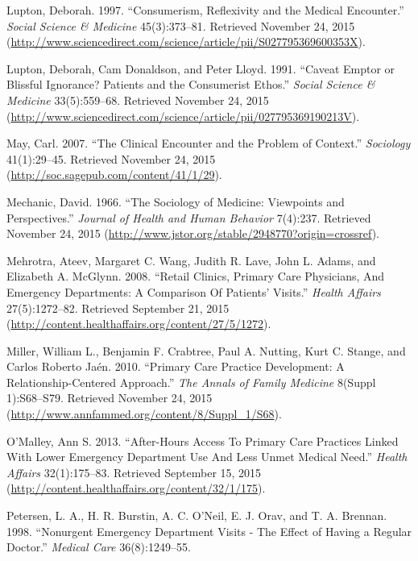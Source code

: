 \documentclass[12pt,twoside]{reedthesis}
\begin{document}
  \hypertarget{ref-luptonux5fconsumerismux5f1997}{}
  Lupton, Deborah. 1997. ``Consumerism, Reflexivity and the Medical
  Encounter.'' \emph{Social Science \& Medicine} 45(3):373--81. Retrieved
  November 24, 2015
  (\url{http://www.sciencedirect.com/science/article/pii/S027795369600353X}).
  
  \hypertarget{ref-luptonux5fcaveatux5f1991}{}
  Lupton, Deborah, Cam Donaldson, and Peter Lloyd. 1991. ``Caveat Emptor
  or Blissful Ignorance? Patients and the Consumerist Ethos.''
  \emph{Social Science \& Medicine} 33(5):559--68. Retrieved November 24,
  2015
  (\url{http://www.sciencedirect.com/science/article/pii/027795369190213V}).
  
  \hypertarget{ref-mayux5fclinicalux5f2007}{}
  May, Carl. 2007. ``The Clinical Encounter and the Problem of Context.''
  \emph{Sociology} 41(1):29--45. Retrieved November 24, 2015
  (\url{http://soc.sagepub.com/content/41/1/29}).
  
  \hypertarget{ref-mechanicux5fsociologyux5f1966}{}
  Mechanic, David. 1966. ``The Sociology of Medicine: Viewpoints and
  Perspectives.'' \emph{Journal of Health and Human Behavior} 7(4):237.
  Retrieved November 24, 2015
  (\url{http://www.jstor.org/stable/2948770?origin=crossref}).
  
  \hypertarget{ref-mehrotraux5fretailux5f2008}{}
  Mehrotra, Ateev, Margaret C. Wang, Judith R. Lave, John L. Adams, and
  Elizabeth A. McGlynn. 2008. ``Retail Clinics, Primary Care Physicians,
  And Emergency Departments: A Comparison Of Patients' Visits.''
  \emph{Health Affairs} 27(5):1272--82. Retrieved September 21, 2015
  (\url{http://content.healthaffairs.org/content/27/5/1272}).
  
  \hypertarget{ref-millerux5fprimaryux5f2010}{}
  Miller, William L., Benjamin F. Crabtree, Paul A. Nutting, Kurt C.
  Stange, and Carlos Roberto Jaén. 2010. ``Primary Care Practice
  Development: A Relationship-Centered Approach.'' \emph{The Annals of
  Family Medicine} 8(Suppl 1):S68--S79. Retrieved November 24, 2015
  (\url{http://www.annfammed.org/content/8/Suppl_1/S68}).
  
  \hypertarget{ref-OMALLEYux5f2013}{}
  O'Malley, Ann S. 2013. ``After-Hours Access To Primary Care Practices
  Linked With Lower Emergency Department Use And Less Unmet Medical
  Need.'' \emph{Health Affairs} 32(1):175--83. Retrieved September 15,
  2015 (\url{http://content.healthaffairs.org/content/32/1/175}).
  
  \hypertarget{ref-petersenux5fnonurgentux5f1998}{}
  Petersen, L. A., H. R. Burstin, A. C. O'Neil, E. J. Orav, and T. A.
  Brennan. 1998. ``Nonurgent Emergency Department Visits - The Effect of
  Having a Regular Doctor.'' \emph{Medical Care} 36(8):1249--55.
  
\end{document}
